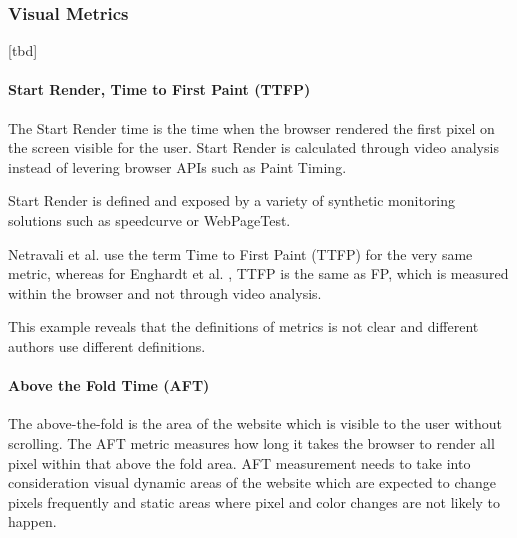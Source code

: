 
\subsubsection{Visual Metrics}

[tbd]








\paragraph{Start Render, Time to First Paint (TTFP)}

The Start Render time is the time when the browser rendered the first pixel on the screen visible for the user.
Start Render is calculated through video analysis instead of levering browser APIs such as Paint Timing.

Start Render is defined and exposed by a variety of synthetic monitoring solutions such as speedcurve or WebPageTest.

Netravali et al. use the term Time to First Paint (TTFP) for the very same metric, %
whereas for Enghardt et al. , TTFP is the same as FP, which is measured within the browser and not through video analysis. %

This example reveals that the definitions of metrics is not clear and different authors use different definitions.







\paragraph{Above the Fold Time (AFT)}

The above-the-fold is the area of the website which is visible to the user without scrolling.
The AFT metric measures how long it takes the browser to render all pixel within that above the fold area.
AFT measurement needs to take into consideration visual dynamic areas of the website which are expected to change pixels frequently and static areas where pixel and color changes are not likely to happen. %

